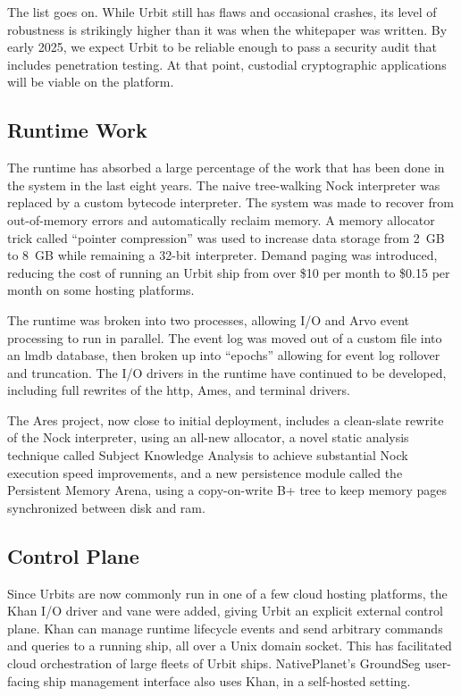 \documentclass[twoside]{article}
\begin{document}
The list goes on.  While Urbit still has flaws and occasional crashes, its level of robustness is strikingly higher than it was when the whitepaper was written.  By early 2025, we expect Urbit to be reliable enough to pass a security audit that includes penetration testing.  At that point, custodial cryptographic applications will be viable on the platform.

\subsection{Runtime Work}

The runtime has absorbed a large percentage of the work that has been done in the system in the last eight years.  The naive tree-walking Nock interpreter was replaced by a custom bytecode interpreter.  The system was made to recover from out-of-memory errors and automatically reclaim memory.  A memory allocator trick called ``pointer compression'' was used to increase data storage from 2~GB to 8~GB while remaining a 32-bit interpreter.  Demand paging was introduced, reducing the cost of running an Urbit ship from over \$10 per month to \$0.15 per month on some hosting platforms.

The runtime was broken into two processes, allowing I/O and Arvo event processing to run in parallel.  The event log was moved out of a custom file into an {\sc lmdb} database, then broken up into ``epochs'' allowing for event log rollover and truncation.  The I/O drivers in the runtime have continued to be developed, including full rewrites of the {\sc http}, Ames, and terminal drivers.  

The Ares project, now close to initial deployment, includes a clean-slate rewrite of the Nock interpreter, using an all-new allocator, a novel static analysis technique called Subject Knowledge Analysis to achieve substantial Nock execution speed improvements, and a new persistence module called the Persistent Memory Arena, using a copy-on-write B+ tree to keep memory pages synchronized between disk and {\sc ram}.

\subsection{Control Plane}

Since Urbits are now commonly run in one of a few cloud hosting platforms, the Khan I/O driver and vane were added, giving Urbit an explicit external control plane.  Khan can manage runtime lifecycle events and send arbitrary commands and queries to a running ship, all over a Unix domain socket.  This has facilitated cloud orchestration of large fleets of Urbit ships.  NativePlanet's GroundSeg user-facing ship management interface \citep{GroundSeg} also uses Khan, in a self-hosted setting.
\end{document}
